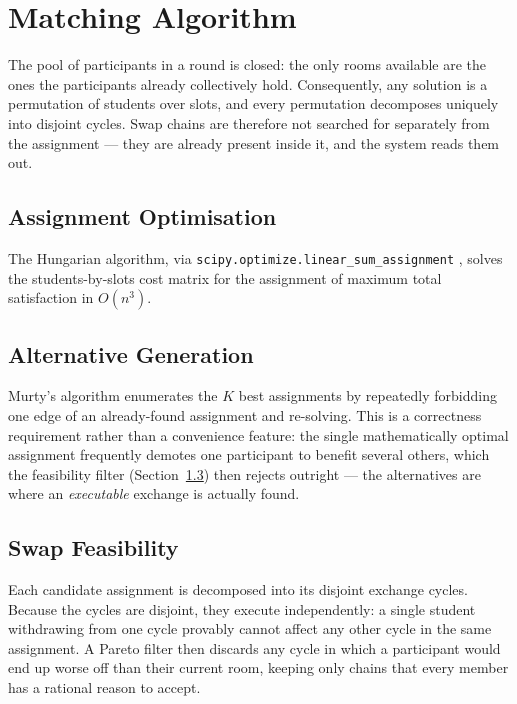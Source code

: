 \documentclass[11pt,a4paper]{report}
\begin{document}
\section{Matching Algorithm}

The pool of participants in a round is closed: the only rooms
available are the ones the participants already collectively hold.
Consequently, any solution is a permutation of students over slots,
and every permutation decomposes uniquely into disjoint cycles. Swap
chains are therefore not searched for separately from the assignment
--- they are already present inside it, and the system reads them out.

\subsection{Assignment Optimisation}

The Hungarian algorithm, via
\texttt{scipy.optimize.linear\_sum\_assignment}
\autocite{kuhn1955hungarian,virtanen2020scipy}, solves the
students-by-slots cost matrix for the assignment of maximum total
satisfaction in $O(n^3)$.

\subsection{Alternative Generation}

Murty's algorithm \autocite{murty1968ranking} enumerates the $K$ best
assignments by repeatedly forbidding one edge of an already-found
assignment and re-solving. This is a correctness requirement rather
than a convenience feature: the single mathematically optimal
assignment frequently demotes one participant to benefit several
others, which the feasibility filter (Section~\ref{sec:feasibility})
then rejects outright --- the alternatives are where an
\emph{executable} exchange is actually found.

\subsection{Swap Feasibility}
\label{sec:feasibility}

Each candidate assignment is decomposed into its disjoint exchange
cycles. Because the cycles are disjoint, they execute independently:
a single student withdrawing from one cycle provably cannot affect
any other cycle in the same assignment. A Pareto filter then discards
any cycle in which a participant would end up worse off than their
current room, keeping only chains that every member has a rational
reason to accept.
\end{document}
